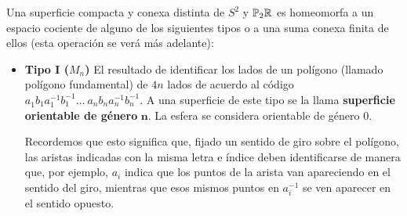 \documentclass[GTS.tex]{subfiles}
\begin{document}
\begin{teorema}
Una superficie compacta y conexa distinta de $S^2$ y $\mathbb{P}_2\mathbb{R}$ es homeomorfa a un espacio cociente de alguno de los siguientes tipos o a una suma conexa finita de ellos (esta operación se verá más adelante):
\begin{itemize}
\item \textbf{Tipo I ($M_n$)}
El resultado de identificar los lados de un polígono (llamado polígono fundamental) de $4n$ lados de acuerdo al código $a^{}_1 b^{}_1 a^{-1}_1 b^{-1}_1\dots\ a^{}_n b^{}_n a_n^{-1} b_n^{-1}$. A una superficie de este tipo se la llama \textbf{superficie orientable de género} $\mathbf{n}$. La esfera se considera orientable de género $0$.

Recordemos que esto significa que, fijado un sentido de giro sobre el polígono, las aristas indicadas con la misma letra e índice deben identificarse de manera que, por ejemplo,  $a_i$ indica que los puntos de la arista van apareciendo en el sentido del giro, mientras que esos mismos puntos en  $a_i^{-1}$ se ven aparecer  en el sentido opuesto.

\begin{center}
\end{center}
\end{itemize}
\end{teorema}
\end{document}
